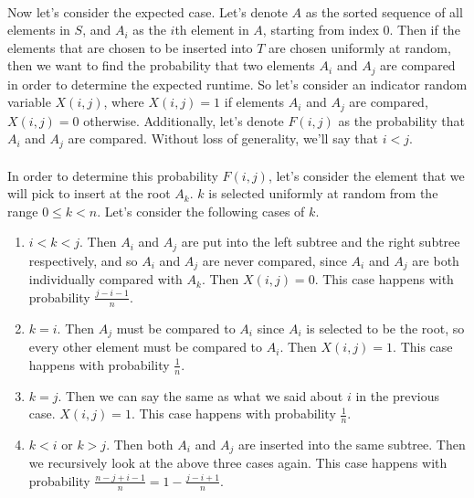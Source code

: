 \documentclass{article}
\begin{document}
\paragraph{} Now let's consider the expected case. Let's denote $A$ as the sorted sequence of all elements in $S$, and $A_i$ as the $i$th element in $A$, starting from index 0. Then if the elements that are chosen to be inserted into $T$ are chosen uniformly at random, then we want to find the probability that two elements $A_i$ and $A_j$ are compared in order to determine the expected runtime. So let's consider an indicator random variable $X(i, j)$, where $X(i, j) = 1$ if elements $A_i$ and $A_j$ are compared, $X(i, j) = 0$ otherwise. Additionally, let's denote $F(i, j)$ as the probability that $A_i$ and $A_j$ are compared. Without loss of generality, we'll say that $i < j$.

\paragraph{} In order to determine this probability $F(i, j)$, let's consider the element that we will pick to insert at the root $A_k$. $k$ is selected uniformly at random from the range $0 \leq k < n$. Let's consider the following cases of $k$.

\begin{enumerate}

\item $i < k < j$. Then $A_i$ and $A_j$ are put into the left subtree and the right subtree respectively, and so $A_i$ and $A_j$ are never compared, since $A_i$ and $A_j$ are both individually compared with $A_k$. Then $X(i, j) = 0$. This case happens with probability $\frac{j - i - 1}{n}$.

\item $k = i$. Then $A_j$ must be compared to $A_i$ since $A_i$ is selected to be the root, so every other element must be compared to $A_i$. Then $X(i, j) = 1$. This case happens with probability $\frac{1}{n}$.

\item $k = j$. Then we can say the same as what we said about $i$ in the previous case. $X(i, j) = 1$. This case happens with probability $\frac{1}{n}$.

\item $k < i$ or $k > j$. Then both $A_i$ and $A_j$ are inserted into the same subtree. Then we recursively look at the above three cases again. This case happens with probability $\frac{n - j + i - 1}{n} = 1 - \frac{j - i + 1}{n}$.

\end{enumerate}
\end{document}
